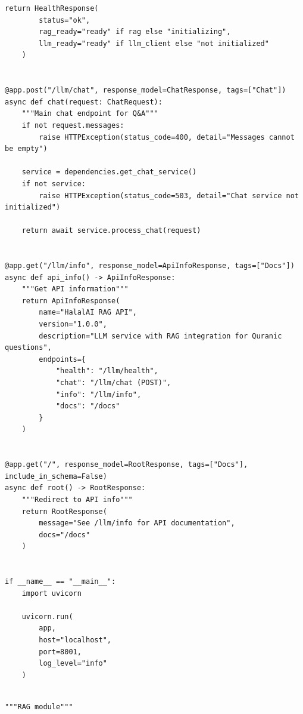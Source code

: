 \begin{lstlisting}[basicstyle=\tiny\ttfamily,breaklines=true]
    return HealthResponse(
        status="ok",
        rag_ready="ready" if rag else "initializing",
        llm_ready="ready" if llm_client else "not initialized"
    )


@app.post("/llm/chat", response_model=ChatResponse, tags=["Chat"])
async def chat(request: ChatRequest):
    """Main chat endpoint for Q&A"""
    if not request.messages:
        raise HTTPException(status_code=400, detail="Messages cannot be empty")

    service = dependencies.get_chat_service()
    if not service:
        raise HTTPException(status_code=503, detail="Chat service not initialized")

    return await service.process_chat(request)


@app.get("/llm/info", response_model=ApiInfoResponse, tags=["Docs"])
async def api_info() -> ApiInfoResponse:
    """Get API information"""
    return ApiInfoResponse(
        name="HalalAI RAG API",
        version="1.0.0",
        description="LLM service with RAG integration for Quranic questions",
        endpoints={
            "health": "/llm/health",
            "chat": "/llm/chat (POST)",
            "info": "/llm/info",
            "docs": "/docs"
        }
    )


@app.get("/", response_model=RootResponse, tags=["Docs"], include_in_schema=False)
async def root() -> RootResponse:
    """Redirect to API info"""
    return RootResponse(
        message="See /llm/info for API documentation",
        docs="/docs"
    )


if __name__ == "__main__":
    import uvicorn

    uvicorn.run(
        app,
        host="localhost",
        port=8001,
        log_level="info"
    )
\end{lstlisting}

\begin{lstlisting}[basicstyle=\tiny\ttfamily,breaklines=true]

"""RAG module"""
\end{lstlisting}

